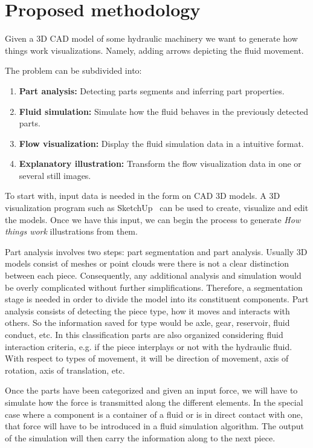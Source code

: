 \chapter{Proposed methodology}

Given a 3D CAD model of some hydraulic machinery we want to generate how things work visualizations.
Namely, adding arrows depicting the fluid movement.

The problem can be subdivided into:
\begin{enumerate}
\item \textbf{Part analysis:} Detecting parts segments and inferring part properties.
\item \textbf{Fluid simulation:} Simulate how the fluid behaves in the previously detected parts.
\item \textbf{Flow visualization:} Display the fluid simulation data in a intuitive format.
\item \textbf{Explanatory illustration:} Transform the flow visualization data in one or several still images.
\end{enumerate}

To start with, input data is needed in the form on CAD 3D models.
A 3D visualization program such as SketchUp~\cite{Trimble2014} can be used to create, visualize and edit the models.
Once we have this input, we can begin the process to generate \textit{How things work} illustrations from them.

Part analysis involves two steps: part segmentation and part analysis.
Usually 3D models consist of meshes or point clouds were there is not a clear distinction between each piece.
Consequently, any additional analysis and simulation would be overly complicated without further simplifications.  
Therefore, a segmentation stage is needed in order to divide the model into its constituent components.
Part analysis consists of detecting the piece type, how it moves and interacts with others.
So the information saved for type would be axle, gear, reservoir, fluid conduct, etc.
In this classification parts are also organized considering fluid interaction criteria, e.g. if the piece interplays or not with the hydraulic fluid.
With respect to types of movement, it will be direction of movement, axis of rotation, axis of translation, etc.

Once the parts have been categorized and given an input force, we will have to simulate how the force is transmitted along the different elements.
In the special case where a component is a container of a fluid or is in direct contact with one, that force will have to be introduced in a fluid simulation algorithm.
The output of the simulation will then carry the information along to the next piece.

